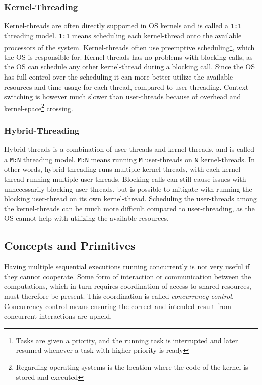\subsubsection{Kernel-Threading}

Kernel-threads are often directly supported in OS kernels and is called a \texttt{1:1} threading model. \texttt{1:1} means scheduling each kernel-thread onto the available processors of the system. Kernel-threads often use preemptive scheduling\footnote{Tasks are given a priority, and the running task is interrupted and later resumed whenever a task with higher priority is ready}, which the OS is responsible for. Kernel-threads has no problems with blocking calls, as the OS can schedule any other kernel-thread during a blocking call. Since the OS has full control over the scheduling it can more better utilize the available resources and time usage for each thread, compared to user-threading. Context switching is however much slower than user-threads because of overhead and kernel-space\footnote{Regarding operating systems is the location where the code of the kernel is stored and executed} crossing.


\subsubsection{Hybrid-Threading}

Hybrid-threads is a combination of user-threads and kernel-threads, and is called a \texttt{M:N} threading model. \texttt{M:N} means running \texttt{M} user-threads on \texttt{N} kernel-threads. In other words, hybrid-threading runs multiple kernel-threads, with each kernel-thread running multiple user-threads. Blocking calls can still cause issues with unnecessarily blocking user-threads, but is possible to mitigate with running the blocking user-thread on its own kernel-thread. Scheduling the user-threads among the kernel-threads can be much more difficult compared to user-threading, as the OS cannot help with utilizing the available resources. 


\subsection{Concepts and Primitives}
\label{subsec:concepts_primitives}

Having multiple sequential executions running concurrently is not very useful if they cannot cooperate. Some form of interaction or communication between the computations, which in turn requires coordination of access to shared resources, must therefore be present. This coordination is called \textit{concurrency control}. Concurrency control means ensuring the correct and intended result from concurrent interactions are upheld. 

